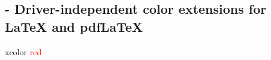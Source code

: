 
\subsection{ - Driver-independent color extensions for LaTeX and pdfLaTeX}

\begin{demo}{}{xcolor}
  \textcolor{red}{red}
\end{demo}

